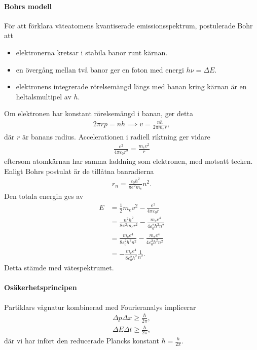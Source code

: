 \paragraph{Bohrs modell}
För att förklara väteatomens kvantiserade emissionsspektrum, postulerade Bohr att
\begin{itemize}
	\item elektronerna kretsar i stabila banor runt kärnan.
	\item en övergång mellan två banor ger en foton med energi $h\nu = \Delta E$.
	\item elektronens integrerade rörelsemängd längs med banan kring kärnan är en heltalsmultipel av $h$.
\end{itemize}
Om elektronen har konstant rörelsemängd i banan, ger detta
\begin{align*}
	2\pi rp = nh \implies v = \frac{nh}{2\pi m_{e}r},
\end{align*}
där $r$ är banans radius. Accelerationen i radiell riktning ger vidare
\begin{align*}
	\frac{e^{2}}{4\pi\varepsilon_{0}r^{2}} = \frac{m_{e}v^{2}}{r}
\end{align*}
eftersom atomkärnan har samma laddning som elektronen, med motsatt tecken. Enligt Bohrs postulat är de tillåtna banradierna
\begin{align*}
	r_{n} = \frac{\varepsilon_{0}h^{2}}{\pi e^{2}m_{e}}n^{2}.
\end{align*}
Den totala energin ges av
\begin{align*}
	E &= \frac{1}{2}m_{e}v^{2} - \frac{e^{2}}{4\pi\varepsilon_{0}r} \\
	  &= \frac{n^{2}h^{2}}{8\pi^{2}m_{e}r^{2}} - \frac{m_{e}e^{4}}{4\varepsilon_{0}^{2}h^{2}n^{2}} \\
	  &= \frac{m_{e}e^{4}}{8\varepsilon_{0}^{2}h^{2}n^{2}} - \frac{m_{e}e^{4}}{4\varepsilon_{0}^{2}h^{2}n^{2}} \\
	  &= -\frac{m_{e}e^{4}}{8\varepsilon_{0}^{2}h^{2}}\frac{1}{n^{2}}.
\end{align*}
Detta stämde med vätespektrumet.

\paragraph{Osäkerhetsprincipen}
Partiklars vågnatur kombinerad med Fourieranalys implicerar
\begin{align*}
	\Delta p \Delta x \geq \frac{\hbar}{2\pi}, \\
	\Delta E \Delta t \geq \frac{\hbar}{2\pi},
\end{align*}
där vi har infört den reducerade Plancks konstant $\hbar = \frac{h}{2\pi}$.

